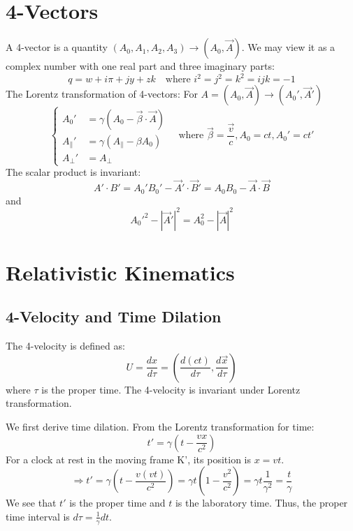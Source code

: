 \documentclass{article}
\begin{document}
	\section*{4-Vectors}
	A 4-vector is a quantity $(A_0, A_1, A_2, A_3) \to (A_0, \vec{A})$. We may view it as a complex number with one real part and three imaginary parts:
	\begin{equation*}
		q = w + i\pi + jy + zk \quad \text{where } i^2=j^2=k^2=ijk=-1
	\end{equation*}
	The Lorentz transformation of 4-vectors:
	For $A=(A_0, \vec{A}) \to (A_0', \vec{A}')$
	\begin{equation}
		\left\{
		\begin{aligned}
			A_0' &= \gamma(A_0 - \vec{\beta} \cdot \vec{A}) \\
			A_{\parallel}' &= \gamma(A_{\parallel} - \beta A_0) \\
			A_{\perp}' &= A_{\perp}
		\end{aligned}
		\right.
		\quad \text{where } \vec{\beta} = \frac{\vec{v}}{c}, A_0 = ct, A_0' = ct'
	\end{equation}
	The scalar product is invariant:
	\begin{equation}
		A' \cdot B' = A_0' B_0' - \vec{A}' \cdot \vec{B}' = A_0 B_0 - \vec{A} \cdot \vec{B}
	\end{equation}
	and
	\begin{equation}
		A_0'^2 - |\vec{A}'|^2 = A_0^2 - |\vec{A}|^2
	\end{equation}
	
	\section*{Relativistic Kinematics}
	
	\subsection*{4-Velocity and Time Dilation}
	The 4-velocity is defined as:
	\begin{equation}
		U = \frac{dx}{d\tau} = \left(\frac{d(ct)}{d\tau}, \frac{d\vec{x}}{d\tau}\right)
	\end{equation}
	where $\tau$ is the proper time. The 4-velocity is invariant under Lorentz transformation.
	
	We first derive time dilation. From the Lorentz transformation for time:
	\begin{equation*}
		t' = \gamma\left(t - \frac{vx}{c^2}\right)
	\end{equation*}
	For a clock at rest in the moving frame K', its position is $x=vt$.
	\begin{equation*}
		\Rightarrow t' = \gamma\left(t - \frac{v(vt)}{c^2}\right) = \gamma t \left(1 - \frac{v^2}{c^2}\right) = \gamma t \frac{1}{\gamma^2} = \frac{t}{\gamma}
	\end{equation*}
	We see that $t'$ is the proper time and $t$ is the laboratory time.
	Thus, the proper time interval is $d\tau = \frac{1}{\gamma} dt$.
	
\end{document}
